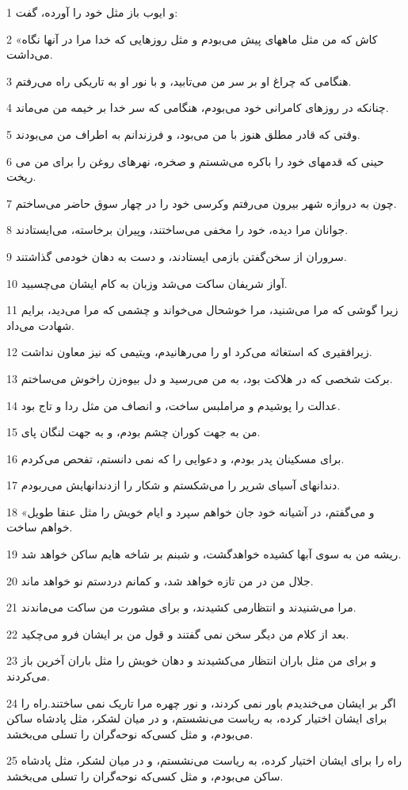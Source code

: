 \par 1 و ایوب باز مثل خود را آورده، گفت:
\par 2 «کاش که من مثل ماههای پیش می‌بودم و مثل روزهایی که خدا مرا در آنها نگاه می‌داشت.
\par 3 هنگامی که چراغ او بر سر من می‌تابید، و با نور او به تاریکی راه می‌رفتم.
\par 4 چنانکه در روزهای کامرانی خود می‌بودم، هنگامی که سر خدا بر خیمه من می‌ماند.
\par 5 وقتی که قادر مطلق هنوز با من می‌بود، و فرزندانم به اطراف من می‌بودند.
\par 6 حینی که قدمهای خود را باکره می‌شستم و صخره، نهرهای روغن را برای من می ریخت.
\par 7 چون به دروازه شهر بیرون می‌رفتم وکرسی خود را در چهار سوق حاضر می‌ساختم.
\par 8 جوانان مرا دیده، خود را مخفی می‌ساختند، وپیران برخاسته، می‌ایستادند.
\par 9 سروران از سخن‌گفتن بازمی ایستادند، و دست به دهان خودمی گذاشتند.
\par 10 آواز شریفان ساکت می‌شد وزبان به کام ایشان می‌چسبید.
\par 11 زیرا گوشی که مرا می‌شنید، مرا خوشحال می‌خواند و چشمی که مرا می‌دید، برایم شهادت می‌داد.
\par 12 زیرافقیری که استغاثه می‌کرد او را می‌رهانیدم، ویتیمی که نیز معاون نداشت.
\par 13 برکت شخصی که در هلاکت بود، به من می‌رسید و دل بیوه‌زن راخوش می‌ساختم.
\par 14 عدالت را پوشیدم و مراملبس ساخت، و انصاف من مثل ردا و تاج بود.
\par 15 من به جهت کوران چشم بودم، و به جهت لنگان پای.
\par 16 برای مسکینان پدر بودم، و دعوایی را که نمی دانستم، تفحص می‌کردم.
\par 17 دندانهای آسیای شریر را می‌شکستم و شکار را ازدندانهایش می‌ربودم.
\par 18 «و می‌گفتم، در آشیانه خود جان خواهم سپرد و ایام خویش را مثل عنقا طویل خواهم ساخت.
\par 19 ریشه من به سوی آبها کشیده خواهدگشت، و شبنم بر شاخه هایم ساکن خواهد شد.
\par 20 جلال من در من تازه خواهد شد، و کمانم دردستم نو خواهد ماند.
\par 21 مرا می‌شنیدند و انتظارمی کشیدند، و برای مشورت من ساکت می‌ماندند.
\par 22 بعد از کلام من دیگر سخن نمی گفتند و قول من بر ایشان فرو می‌چکید.
\par 23 و برای من مثل باران انتظار می‌کشیدند و دهان خویش را مثل باران آخرین باز می‌کردند.
\par 24 اگر بر ایشان می‌خندیدم باور نمی کردند، و نور چهره مرا تاریک نمی ساختند.راه را برای ایشان اختیار کرده، به ریاست می‌نشستم، و در میان لشکر، مثل پادشاه ساکن می‌بودم، و مثل کسی‌که نوحه‌گران را تسلی می‌بخشد.
\par 25 راه را برای ایشان اختیار کرده، به ریاست می‌نشستم، و در میان لشکر، مثل پادشاه ساکن می‌بودم، و مثل کسی‌که نوحه‌گران را تسلی می‌بخشد.
 
